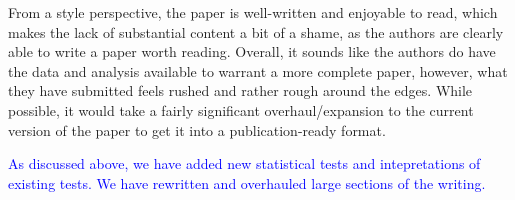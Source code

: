 \documentclass[12pt]{article}
\begin{document}
From a style perspective, the paper is well-written and enjoyable to
read, which makes the lack of substantial content a bit of a shame, as
the authors are clearly able to write a paper worth reading. Overall,
it sounds like the authors do have the data and analysis available to
warrant a more complete paper, however, what they have submitted feels
rushed and rather rough around the edges. While possible, it would
take a fairly significant overhaul/expansion to the current version of
the paper to get it into a publication-ready format.

\textcolor{blue}{As discussed above, we have added new statistical
  tests and intepretations of existing tests.  We have rewritten and
  overhauled large sections of the writing.}
\end{document}
